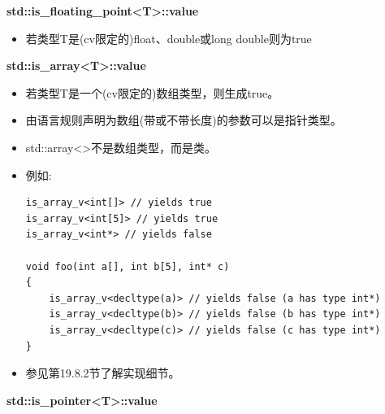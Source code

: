\textbf{std::is\_floating\_point<T>::value}

\begin{itemize}
\item 
若类型T是(cv限定的)float、double或long double则为true
\end{itemize}

\textbf{std::is\_array<T>::value}

\begin{itemize}
\item 
若类型T是一个(cv限定的)数组类型，则生成true。

\item 
由语言规则声明为数组(带或不带长度)的参数可以是指针类型。

\item 
std::array<>不是数组类型，而是类。

\item 
例如:

\begin{lstlisting}[style=styleCXX]
is_array_v<int[]> // yields true
is_array_v<int[5]> // yields true
is_array_v<int*> // yields false

void foo(int a[], int b[5], int* c)
{
	is_array_v<decltype(a)> // yields false (a has type int*)
	is_array_v<decltype(b)> // yields false (b has type int*)
	is_array_v<decltype(c)> // yields false (c has type int*)
}
\end{lstlisting}

\item 
参见第19.8.2节了解实现细节。
\end{itemize}

\textbf{std::is\_pointer<T>::value}

